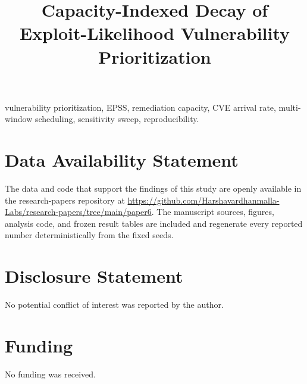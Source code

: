 \documentclass[journal]{IEEEtran}
\title{Capacity-Indexed Decay of Exploit-Likelihood
Vulnerability Prioritization}
\author{%
  \IEEEauthorblockN{Harshavardhan Malla}
  \IEEEauthorblockA{Independent Researcher\\
  Email: harshavardhanmalla75@gmail.com}%
}
\begin{document}
\maketitle

\begin{abstract}

\end{abstract}

\begin{IEEEkeywords}
vulnerability prioritization, EPSS, remediation capacity, CVE arrival rate,
multi-window scheduling, sensitivity sweep, reproducibility.
\end{IEEEkeywords}














\section*{Data Availability Statement}
The data and code that support the findings of this study are openly available in the research-papers repository at \url{https://github.com/Harshavardhanmalla-Labs/research-papers/tree/main/paper6}. The manuscript sources, figures, analysis code, and frozen result tables are included and regenerate every reported number deterministically from the fixed seeds.

\section*{Disclosure Statement}
No potential conflict of interest was reported by the author.

\section*{Funding}
No funding was received.
\end{document}
